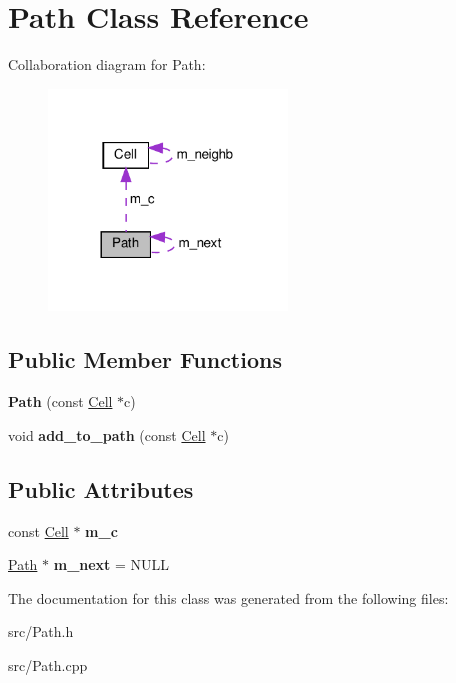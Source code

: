 \hypertarget{class_path}{}\section{Path Class Reference}
\label{class_path}


Collaboration diagram for Path\+:\nopagebreak
\begin{figure}[H]
\begin{center}
\leavevmode
\includegraphics[width=180pt]{class_path__coll__graph}
\end{center}
\end{figure}
\subsection*{Public Member Functions}
\begin{DoxyCompactItemize}
\item 
\mbox{\label{class_path_a2504dfe91b906502e025d7b1edcbf495}} 
{\bfseries Path} (const \hyperlink{class_cell}{Cell} $\ast$c)
\item 
\mbox{\label{class_path_a8906c04ff2144330dc008959edbb9b88}} 
void {\bfseries add\+\_\+to\+\_\+path} (const \hyperlink{class_cell}{Cell} $\ast$c)
\end{DoxyCompactItemize}
\subsection*{Public Attributes}
\begin{DoxyCompactItemize}
\item 
\mbox{\label{class_path_ac3f799e5e94197f961b995bd995d6d77}} 
const \hyperlink{class_cell}{Cell} $\ast$ {\bfseries m\+\_\+c}
\item 
\mbox{\label{class_path_a12376dd7025b04af7a5a79d5191b21b4}} 
\hyperlink{class_path}{Path} $\ast$ {\bfseries m\+\_\+next} = N\+U\+LL
\end{DoxyCompactItemize}


The documentation for this class was generated from the following files\+:\begin{DoxyCompactItemize}
\item 
src/Path.\+h\item 
src/Path.\+cpp\end{DoxyCompactItemize}
